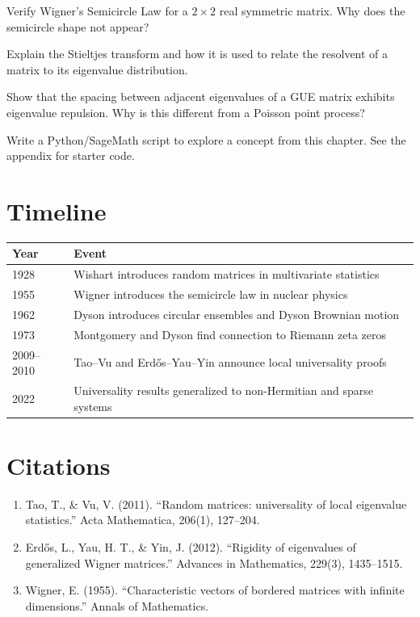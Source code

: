 \begin{exercise}[Basic]
Verify Wigner's Semicircle Law for a $2 \times 2$ real symmetric matrix. Why does the semicircle shape not appear?
\end{exercise}

\begin{exercise}[Intermediate]
Explain the Stieltjes transform and how it is used to relate the resolvent of a matrix to its eigenvalue distribution.
\end{exercise}

\begin{exercise}[Challenge]
Show that the spacing between adjacent eigenvalues of a GUE matrix exhibits eigenvalue repulsion. Why is this different from a Poisson point process?
\end{exercise}

\begin{exercise}[Computational]
Write a Python/SageMath script to explore a concept from this chapter. See the appendix for starter code.
\end{exercise}

\section{Timeline}

\begin{tabularx}{\linewidth}{lX}
\toprule
\textbf{Year} & \textbf{Event} \\ \midrule
1928 & Wishart introduces random matrices in multivariate statistics \\ 
1955 & Wigner introduces the semicircle law in nuclear physics \\ 
1962 & Dyson introduces circular ensembles and Dyson Brownian motion \\ 
1973 & Montgomery and Dyson find connection to Riemann zeta zeros \\ 
2009--2010 & Tao--Vu and Erdős--Yau--Yin announce local universality proofs \cite{taovu2011, erdos2012} \\ 
2022 & Universality results generalized to non-Hermitian and sparse systems \\ \bottomrule
\end{tabularx}

\section{Citations}

\begin{enumerate}
\item Tao, T., \& Vu, V. (2011). ``Random matrices: universality of local eigenvalue statistics.'' Acta Mathematica, 206(1), 127--204.
\item Erdős, L., Yau, H. T., \& Yin, J. (2012). ``Rigidity of eigenvalues of generalized Wigner matrices.'' Advances in Mathematics, 229(3), 1435--1515.
\item Wigner, E. (1955). ``Characteristic vectors of bordered matrices with infinite dimensions.'' Annals of Mathematics.
\end{enumerate}
